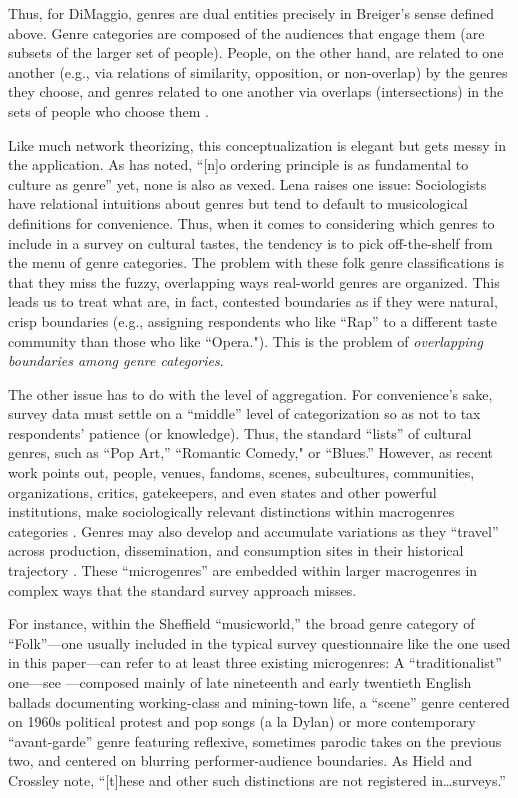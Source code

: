 \documentclass[a4paper,12pt]{extarticle}
\begin{document}
Thus, for DiMaggio, genres are dual entities precisely in Breiger's sense defined above. Genre categories are composed of the audiences that engage them (are subsets of the larger set of people). People, on the other hand, are related to one another (e.g., via relations of similarity, opposition, or non-overlap) by the genres they choose, and genres related to one another via overlaps (intersections) in the sets of people who choose them \citet{lizardo18}. 

Like much network theorizing, this conceptualization is elegant but gets messy in the application. As \citet[149]{lena2015relational} has noted, ``[n]o ordering principle is as fundamental to culture as genre'' yet, none is also as vexed. Lena raises one issue: Sociologists have relational intuitions about genres but tend to default to musicological definitions for convenience. Thus, when it comes to considering which genres to include in a survey on cultural tastes, the tendency is to pick off-the-shelf from the menu of genre categories. The problem with these folk genre classifications is that they miss the fuzzy, overlapping ways real-world genres are organized. This leads us to treat what are, in fact, contested boundaries as if they were natural, crisp boundaries (e.g., assigning respondents who like ``Rap'' to a different taste community than those who like ``Opera."). This is the problem of \textit{overlapping boundaries among genre categories}. 

The other issue has to do with the level of aggregation. For convenience’s sake, survey data must settle on a ``middle'' level of categorization so as not to tax respondents' patience (or knowledge). Thus, the standard ``lists'' of cultural genres, such as ``Pop Art,'' ``Romantic Comedy," or ``Blues.'' However, as recent work points out, people, venues, fandoms, scenes, subcultures, communities, organizations, critics, gatekeepers, and even states and other powerful institutions, make sociologically relevant distinctions within macrogenres categories \citep{hesmondhalgh2005subcultures, Holt2007, Van_Poecke2018, Hield2014-xe}. Genres may also develop and accumulate variations as they ``travel'' across production, dissemination, and consumption sites in their historical trajectory \citep{Lena2012}. These ``microgenres'' are embedded within larger macrogenres in complex ways that the standard survey approach misses.

For instance, within the Sheffield ``musicworld,'' the broad genre category of ``Folk''---one usually included in the typical survey questionnaire like the one used in this paper---can refer to at least three existing microgenres: A ``traditionalist'' one---see \citep{Lena2012}---composed mainly of late nineteenth and early twentieth English ballads documenting working-class and mining-town life, a ``scene'' genre centered on 1960s political protest and pop songs (a la Dylan) or more contemporary ``avant-garde'' genre featuring reflexive, sometimes parodic takes on the previous two, and centered on blurring performer-audience boundaries. As Hield and Crossley \citeyearpar[197]{Hield2014-xe} note, ``[t]hese and other such distinctions are not registered in\ldots surveys.''
\end{document}
